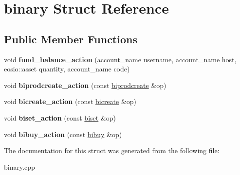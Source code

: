 \hypertarget{structbinary}{}\section{binary Struct Reference}
\label{structbinary}
\subsection*{Public Member Functions}
\begin{DoxyCompactItemize}
\item 
\mbox{\label{structbinary_a2e6f6bb9e2423ec0d03c4556d7a17a62}} 
void {\bfseries fund\+\_\+balance\+\_\+action} (account\+\_\+name username, account\+\_\+name host, eosio\+::asset quantity, account\+\_\+name code)
\item 
\mbox{\label{structbinary_a580e76f0c4f64abf09cf588cd36579c2}} 
void {\bfseries biprodcreate\+\_\+action} (const \mbox{\hyperlink{structeosio_1_1biprodcreate}{biprodcreate}} \&op)
\item 
\mbox{\label{structbinary_aa8efda3382ea7b41cf3487f355ed8323}} 
void {\bfseries bicreate\+\_\+action} (const \mbox{\hyperlink{structeosio_1_1bicreate}{bicreate}} \&op)
\item 
\mbox{\label{structbinary_a32170478a6b44250ffd4d1e5dbb42cc1}} 
void {\bfseries biset\+\_\+action} (const \mbox{\hyperlink{structeosio_1_1biset}{biset}} \&op)
\item 
\mbox{\label{structbinary_a463ee6e026e96222faf976cd407d47b1}} 
void {\bfseries bibuy\+\_\+action} (const \mbox{\hyperlink{structeosio_1_1bibuy}{bibuy}} \&op)
\end{DoxyCompactItemize}


The documentation for this struct was generated from the following file\+:\begin{DoxyCompactItemize}
\item 
binary.\+cpp\end{DoxyCompactItemize}
